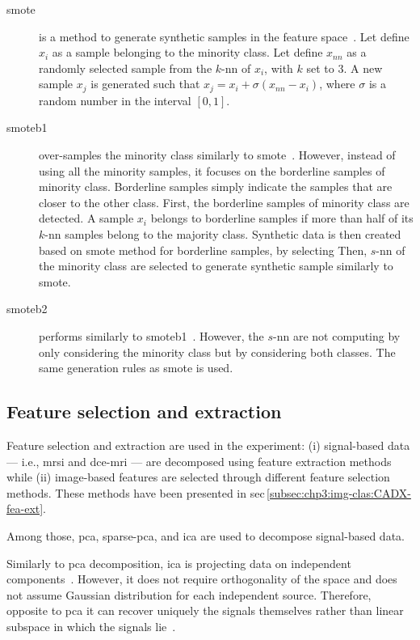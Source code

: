 \begin{description}
\item[\Ac{smote}] is a method to generate synthetic samples in the feature space~\cite{chawla2002smote}.
Let define $x_i$ as a sample belonging to the minority class.
Let define $x_{nn}$ as a randomly selected sample from the $k$-\ac{nn} of $x_i$, with $k$ set to 3.
A new sample $x_j$ is generated such that $x_j = x_i + \sigma \left( x_{nn} - x_i \right)$, where $\sigma$ is a random number in the interval $\left[0,1\right]$.
\item[\Ac{smoteb1}] over-samples the minority class similarly to \ac{smote}~\cite{han2005borderline}.
However, instead of using all the minority samples, it focuses on the borderline samples of minority class.
Borderline samples simply indicate the samples that are closer to the other class.
First, the borderline samples of minority class are detected.
A sample $x_{i}$ belongs to borderline samples if more than half of its $k$-\ac{nn} samples belong to the majority class.
Synthetic data is then created based on \ac{smote} method for borderline samples, by selecting 
Then, $s$-\ac{nn} of the minority class are selected to generate synthetic sample similarly to \ac{smote}.
 
\item[\Ac{smoteb2}] performs similarly to \ac{smoteb1}~\cite{han2005borderline}.
However, the $s$-\ac{nn} are not computing by only considering the minority class but by considering both classes.
The same generation rules as \ac{smote} is used.
\end{description}

\subsection{Feature selection and extraction}\label{subsec:chp6:method:fea-sel}

Feature selection and extraction are used in the experiment: (i) signal-based data --- i.e., \ac{mrsi} and \ac{dce}-\ac{mri} --- are decomposed using feature extraction methods while (ii) image-based features are selected through different feature selection methods.
These methods have been presented in \acs{sec}\,\ref{subsec:chp3:img-clas:CADX-fea-ext}.

Among those, \ac{pca}, sparse-\ac{pca}, and \ac{ica} are used to decompose signal-based data.

Similarly to \ac{pca} decomposition, \ac{ica} is projecting data on independent components~\cite{comon1994independent}.
However, it does not require orthogonality of the space and does not assume Gaussian distribution for each independent source.
Therefore, opposite to \ac{pca} it can recover uniquely the signals themselves rather than linear subspace in which the signals lie~\cite{murphy2012machine}.

